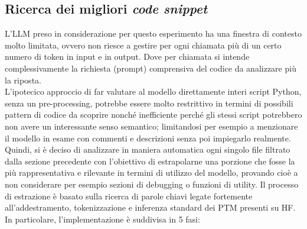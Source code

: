 \documentclass{article}
\begin{document}
\subsection{Ricerca dei migliori \textit{code snippet}}
L'LLM preso in considerazione per questo esperimento ha una finestra di contesto molto limitata, ovvero non riesce a gestire per ogni chiamata più di un certo numero di token in input e in output. Dove per chiamata si intende complessivamente la richiesta (prompt) comprensiva del codice da analizzare più la riposta.\\
L'ipotecico approccio di far valutare al modello direttamente interi script Python, senza un pre-processing, potrebbe essere molto restrittivo in termini di possibili pattern di codice da scoprire nonché inefficiente perché gli stessi script potrebbero non avere un interessante senso semantico; limitandosi per esempio a menzionare il modello in esame con commenti e descrizioni senza poi impiegarlo realmente.\\
Quindi, si è deciso di analizzare in maniera automatica ogni singolo file filtrato dalla sezione precedente con l'obiettivo di estrapolarne una porzione che fosse la più rappresentativa e rilevante in termini di utilizzo del modello, provando cioè a non considerare per esempio sezioni di debugging o funzioni di utility. Il processo di estrazione è basato sulla ricerca di parole chiavi legate fortemente all'addestramento, tokenizzazione e inferenza standard dei PTM presenti su HF. In particolare, l'implementazione è suddivisa in 5 fasi:\\
\end{document}
